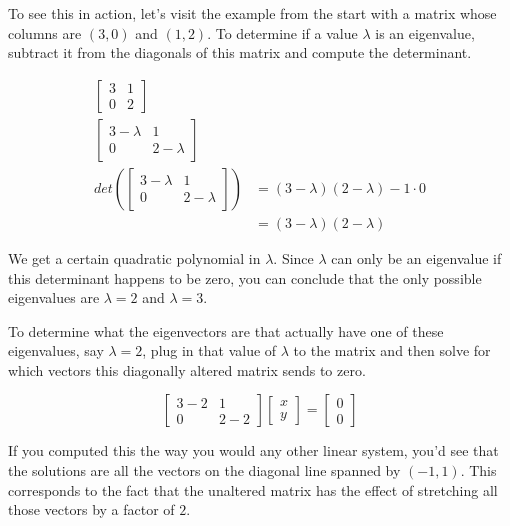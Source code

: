 To see this in action, let's visit the example from the start with a matrix
whose columns are $(3, 0)$ and $(1, 2)$. To determine if a value $\lambda$ is an
eigenvalue, subtract it from the diagonals of this matrix and compute the
determinant.

\begin{align*}
  \begin{bmatrix}
    3 & 1 \\
    0 & 2
  \end{bmatrix} & \\
  \begin{bmatrix}
    3 - \lambda & 1 \\
    0 & 2 - \lambda
  \end{bmatrix} & \\
  det\left(\begin{bmatrix}
    3 - \lambda & 1 \\
    0 & 2 - \lambda
  \end{bmatrix}\right) &=
  (3 - \lambda)(2 - \lambda) - 1 \cdot 0 \\
  &= (3 - \lambda)(2 - \lambda)
\end{align*}

We get a certain quadratic polynomial in $\lambda$. Since $\lambda$ can only be
an eigenvalue if this determinant happens to be zero, you can conclude that the
only possible eigenvalues are $\lambda = 2$ and $\lambda = 3$.

To determine what the eigenvectors are that actually have one of these
eigenvalues, say $\lambda = 2$, plug in that value of $\lambda$ to the matrix
and then solve for which vectors this diagonally altered matrix sends to zero.

\begin{equation*}
  \begin{bmatrix}
    3 - 2 & 1 \\
    0 & 2 - 2
  \end{bmatrix}
  \begin{bmatrix}
    x \\
    y
  \end{bmatrix} =
  \begin{bmatrix}
    0 \\
    0
  \end{bmatrix}
\end{equation*}

If you computed this the way you would any other linear system, you'd see that
the solutions are all the vectors on the diagonal line spanned by $(-1, 1)$.
This corresponds to the fact that the unaltered matrix has the effect of
stretching all those vectors by a factor of $2$.

